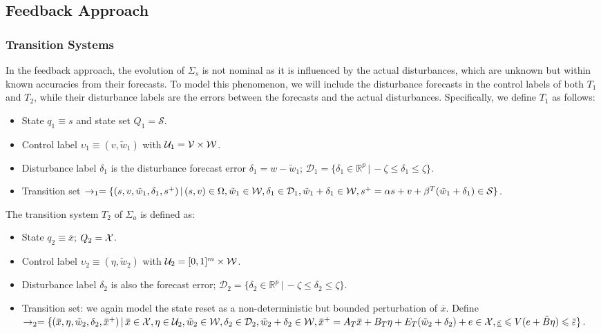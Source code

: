 \subsection{Feedback Approach}
\label{sec:abstraction-gs:feedback}

\subsubsection{Transition Systems}
\label{sec:abstraction-gs:feedback:Ts}

In the feedback approach, the evolution of $\Sigma_{s}$ is not nominal as it is influenced by the actual disturbances, which are unknown but within known accuracies from their forecasts.
To model this phenomenon, we will include the disturbance forecasts in the control labels of both $T_{1}$ and $T_{2}$, while their disturbance labels are the errors between the forecasts and the actual disturbances.
Specifically, we define $T_{1}$ as follows:
\begin{itemize}
\item State $q_{1} \equiv s$ and state set $Q_{1} = \mathcal{S}$.
\item Control label $\upsilon_{1} \equiv (v, \tilde{w}_{1})$ with $\mathcal{U}_{1} = \mathcal{V} \times \mathcal{W}$.
\item Disturbance label $\delta_{1}$ is the disturbance forecast error $\delta_{1} = w - \tilde{w}_{1}$; $\mathcal{D}_{1} = \{ \delta_{1} \in \mathbb{R}^{p} \,|\, -\zeta \leqslant \delta_{1} \leqslant \zeta\}$.
\item Transition set $\rightarrow_{1} = \{ (s, v, \tilde{w}_{1}, \delta_{1}, s^{+}) \,|\, (s,v) \in \Omega,\allowbreak \tilde{w}_{1} \in \mathcal{W},\allowbreak \delta_{1} \in \mathcal{D}_{1},\allowbreak \tilde{w}_{1} + \delta_{1} \in \mathcal{W},\allowbreak s^{+} = \alpha s + v + \beta^{T} (\tilde{w}_{1} + \delta_{1}) \in \mathcal{S}\}$. %
\end{itemize}
%
The transition system $T_{2}$ of $\Sigma_{a}$ is defined as:
\begin{itemize}
\item State $q_{2} \equiv \overbar{x}$; $Q_{2} = \mathcal{X}$.
\item Control label $\upsilon_{2} \equiv (\eta, \tilde{w}_{2})$ with $\mathcal{U}_{2} = [0,1]^{m} \times \mathcal{W}$.
\item Disturbance label $\delta_{2}$ is also the forecast error; $\mathcal{D}_{2} = \{ \delta_{2} \in \mathbb{R}^{p} \,|\, -\zeta \leqslant \delta_{2} \leqslant \zeta\}$.
\item Transition set: we again model the state reset as a non-deterministic but bounded perturbation of $\overbar{x}$.   Define $\rightarrow_{2} = \{ (\overbar{x}, \eta, \tilde{w}_{2}, \delta_{2}, \overbar{x}^{+}) \,|\, \overbar{x} \in \XSet, \eta \in \mathcal{U}_{2}, \tilde{w}_{2} \in \WSet,\allowbreak \delta_{2} \in \mathcal{D}_{2},\allowbreak \tilde{w}_{2} + \delta_{2} \in \WSet,\allowbreak \overbar{x}^{+} = A_{T} \overbar{x}+ B_{T} \eta + E_{T} (\tilde{w}_{2} + \delta_{2}) + e \in \XSet,\allowbreak \underline{\varepsilon} \leqslant V (e + \tilde{B} \eta) \leqslant \overbar{\varepsilon}\}$.
\end{itemize}
